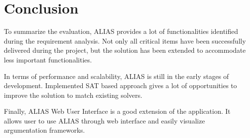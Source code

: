 \section{Conclusion}
To summarize the evaluation, ALIAS provides a lot of functionalities identified during the requirement analysis. Not only all critical items have been successfully delivered during the project, but the solution has been extended to accommodate less important functionalities. 

In terms of performance and scalability, ALIAS is still in the early stages of development. Implemented SAT based approach gives a lot of opportunities to improve the solution to match existing solvers.

Finally, ALIAS Web User Interface is a good extension of the application. It allows user to use ALIAS through web interface and easily visualize argumentation frameworks.